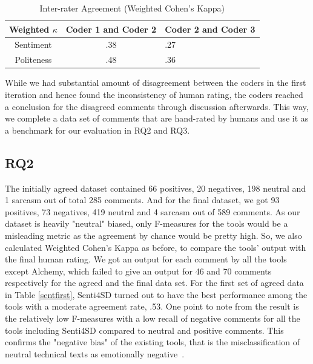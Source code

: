 \vspace{3mm}
\noindent{}
\vspace{3mm}


\begin{table}
\centering
\caption{Inter-rater Agreement (Weighted Cohen's Kappa)}
  \label{interrater}
  \begin{tabular}{|c|c|l|}
    \toprule
    Weighted $\kappa$ & Coder 1 and Coder 2 &  Coder 2 and  Coder 3\\
    \midrule
    Sentiment & .38 & .27 \\
    \hline
    Politeness & .48 & .36\\
  \bottomrule
\end{tabular}
\end{table}

While we had substantial amount of disagreement between the coders in the first iteration and hence found the inconsistency of human rating, the coders reached a conclusion for the disagreed comments through discussion afterwards. This way, we complete a data set of comments that are hand-rated by humans and use it as a benchmark for our evaluation in RQ2 and RQ3.

\subsection{RQ2}
The initially agreed dataset contained 66 positives, 20 negatives, 198 neutral and 1 sarcasm out of total 285 comments. And for the final dataset, we got 93 positives, 73 negatives, 419 neutral and 4 sarcasm out of 589 comments. As our dataset is heavily "neutral" biased, only F-measures for the tools would be a misleading metric as the agreement by chance would be pretty high. So, we also calculated Weighted Cohen's Kappa as before, to compare the tools' output with the final human rating. We got an output for each comment by all the tools except Alchemy, which failed to give an output for 46 and 70 comments respectively for the agreed and the final data set. 
For the first set of agreed data in Table \ref{sentfirst}, Senti4SD turned out to have the best performance among the tools with a  moderate agreement rate, .53. One point to note from the result is the relatively low F-measures with a low recall of negative comments for all the tools including Senti4SD compared to neutral and positive comments. This confirms the "negative bias" of the existing tools, that is the misclassification of neutral
technical texts as emotionally negative~\cite{blaz2016sentiment,novielli2015challenges,calefato2017sentiment}.

